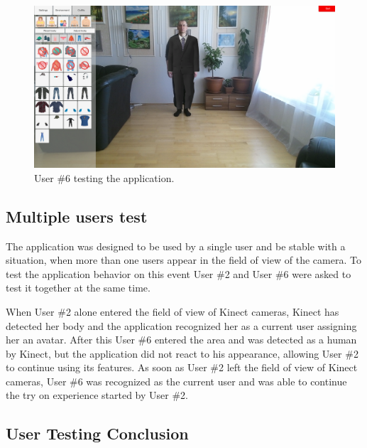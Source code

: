 \documentclass[a4paper]{report}
\begin{document}
\begin{figure}[H]
    \centering
    \includegraphics[width=\textwidth, keepaspectratio]{images/Testing/test_M_M.png}
    
    \caption{User \#6 testing the application.}
    \label{fig:testing_u_6}
\end{figure}
    
    \subsection{Multiple users test}
    \qquad The application was designed to be used by a single user and be stable with a situation, when more than one users appear in the field of view of the camera. To test the application behavior on this event User \#2 and User \#6 were asked to test it together at the same time. 
    
    When User \#2 alone entered the field of view of Kinect cameras, Kinect has detected her body and the application recognized her as a current user assigning her an avatar. After this User \#6 entered the area and was detected as a human by Kinect, but the application did not react to his appearance, allowing User \#2 to continue using its features. As soon as User \#2 left the field of view of Kinect cameras, User \#6 was recognized as the current user and was able to continue the try on experience started by User \#2.
    
    
    
    \subsection{User Testing Conclusion}
\end{document}
